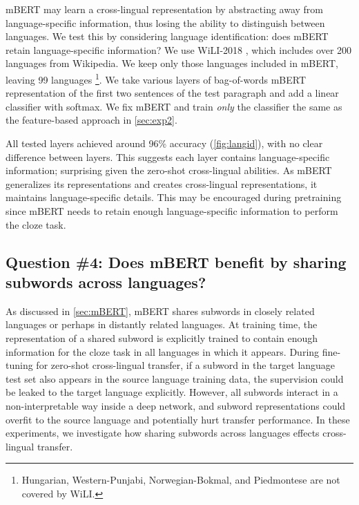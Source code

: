 \documentclass[11pt,a4paper]{article}
\begin{document}
mBERT may learn a cross-lingual representation by abstracting away from language-specific information, thus losing the ability to distinguish between languages. We test this by considering language identification: does mBERT retain language-specific information? We use WiLI-2018 \cite{thoma2018wili}, which includes over 200 languages from Wikipedia. We keep only those languages included in mBERT, leaving 99 languages \footnote{Hungarian, Western-Punjabi, Norwegian-Bokmal, and Piedmontese are not covered by WiLI.}.
We take various layers of bag-of-words mBERT representation of the first two sentences of the test paragraph and add a linear classifier with softmax. We fix mBERT and train \textit{only} the classifier the same as the feature-based approach in \cref{sec:exp2}.

All tested layers achieved around 96\% accuracy (\cref{fig:langid}), with no clear difference between layers. This suggests each layer contains language-specific information; surprising given the zero-shot cross-lingual abilities. As mBERT generalizes its representations and creates cross-lingual representations, it maintains language-specific details. This may be encouraged during pretraining since mBERT needs to retain enough language-specific information to perform the cloze task.

\subsection{Question \#4: Does mBERT benefit by sharing subwords across languages?}\label{sec:exp4}

As discussed in \cref{sec:mBERT}, mBERT shares subwords in closely related languages or perhaps in distantly related languages. At training time, the representation of a shared subword is explicitly trained to contain enough information for the cloze task in all languages in which it appears. During fine-tuning for zero-shot cross-lingual transfer, if a subword in the target language test set also appears in the source language training data, the supervision could be leaked to the target language explicitly. However, all subwords interact in a non-interpretable way inside a deep network, 
and subword representations could overfit to the source language and potentially hurt transfer performance. In these experiments, we investigate how sharing subwords across languages effects cross-lingual transfer.
\end{document}
